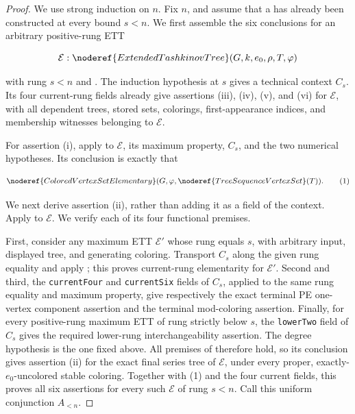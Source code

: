 \begin{proof}
We use strong induction on \(n\).  Fix \(n\), and assume that a
 has already been constructed at every
bound \(s<n\).  We first assemble the six conclusions for an arbitrary
positive-rung ETT

\[
 \mathcal E:\noderef{ExtendedTashkinovTree}(G,k,e_0,\rho,T,\varphi)
\]

with rung \(s<n\) and .  The induction hypothesis
at \(s\) gives a technical context \(C_s\).  Its four current-rung fields
already give assertions (iii), (iv), (v), and (vi) for \(\mathcal E\), with
all dependent trees, stored sets, colorings, first-appearance indices, and
membership witnesses belonging to \(\mathcal E\).

For assertion (i), apply
 to \(\mathcal E\), its maximum
property, \(C_s\), and the two numerical hypotheses.  Its conclusion is
exactly that

\[
 \noderef{ColoredVertexSetElementary}
   (G,\varphi,\noderef{TreeSequenceVertexSet}(T)).              \tag{1}
\]

We next derive assertion (ii), rather than adding it as a field of the
context.  Apply  to
\(\mathcal E\).  We verify each of its four functional premises.

First, consider any maximum ETT \(\mathcal E'\) whose rung equals \(s\),
with arbitrary input, displayed tree, and generating coloring.  Transport
\(C_s\) along the given rung equality and apply
; this proves current-rung
elementarity for \(\mathcal E'\).  Second and third, the
\texttt{currentFour} and \texttt{currentSix} fields of \(C_s\), applied to
the same rung equality and maximum property, give respectively the exact
terminal PE one-vertex component assertion and the terminal mod-coloring
assertion.  Finally, for every positive-rung maximum ETT of rung strictly
below \(s\), the \texttt{lowerTwo} field of \(C_s\) gives the required
lower-rung interchangeability assertion.  The degree hypothesis is the
one fixed above.  All premises of
 therefore hold, so its
conclusion gives assertion (ii) for the exact final series tree of
\(\mathcal E\), under every proper, exactly-\(e_0\)-uncolored stable
coloring.  Together with (1) and the four current fields, this proves all
six assertions for every such \(\mathcal E\) of rung \(s<n\).  Call this
uniform conjunction \(A_{<n}\).


\end{proof}
